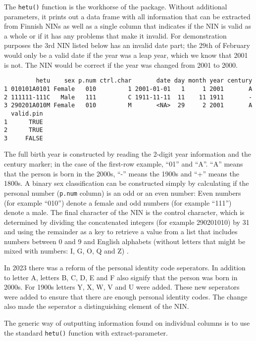 The \texttt{hetu()} function is the workhorse of the  package. Without additional parameters, it prints out a data frame with all information that can be extracted from Finnish NINs as well as a single column that indicates if the NIN is valid as a whole or if it has any problems that make it invalid. For demonstration purposes the 3rd NIN listed below has an invalid date part; the 29th of February would only be a valid date if the year was a leap year, which we know that 2001 is not. The NIN would be correct if the year was changed from 2001 to 2000.

\begin{verbatim}
         hetu    sex p.num ctrl.char       date day month year century
1 010101A0101 Female   010         1 2001-01-01   1     1 2001       A
2 111111-111C   Male   111         C 1911-11-11  11    11 1911       -
3 290201A010M Female   010         M       <NA>  29     2 2001       A
  valid.pin
1      TRUE
2      TRUE
3     FALSE
\end{verbatim}

The full birth year is constructed by reading the 2-digit year information and the century marker; in the case of the first-row example, ``01'' and ``A''. ``A'' means that the person is born in the 2000s, ``-'' means the 1900s and ``+'' means the 1800s. A binary sex classification can be constructed simply by calculating if the personal number (\texttt{p.num} column) is an odd or an even number: Even numbers (for example ``010'') denote a female and odd numbers (for example ``111'') denote a male. The final character of the NIN is the control character, which is determined by dividing the concatenated integers (for example 290201010) by 31 and using the remainder as a key to retrieve a value from a list that includes numbers between 0 and 9 and English alphabets (without letters that might be mixed with numbers: I, G, O, Q and Z) \citep{hetudvv, salste2021}.

In 2023 there was a reform of the personal identity code seperators. In addition to letter A, letters B, C, D, E and F also signify that the person was born in 2000s. For 1900s letters Y, X, W, V and U were added. These new seperators were added to ensure that there are enough personal identity codes. The change also made the seperator a distinguishing element of the NIN. \citep{hetureform}

The generic way of outputting information found on individual columns is to use the standard \texttt{hetu()} function with extract-parameter.


